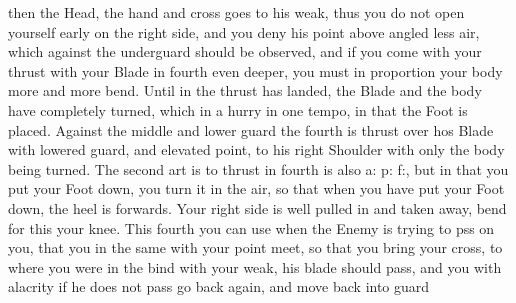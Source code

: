 then the Head, the hand and cross goes to his weak, thus you do not
open yourself early on the right side, and you deny his point above
angled less air,
which against the underguard should be observed, and if you come with
your thrust with your Blade in fourth even deeper, you must in
proportion your body more and more bend. Until in the thrust has
landed, the Blade and the body have completely turned, which in a
hurry in one tempo, in that the Foot is placed. Against the middle and
lower guard the fourth is thrust over hos Blade with lowered guard,
and elevated point, to his right Shoulder with only the body being turned.
The second art is to thrust in fourth is also a: p: f:, but in that
you put your Foot down, you turn it in the air, so that when you have
put your Foot down, the heel is forwards. Your right side is well
pulled in and taken away, bend for this your knee. This fourth you can
use when the Enemy is trying to pss on you, that you in the same with
your point meet, so that you bring your cross, to where you were in
the bind with your weak, his blade should pass, and you with alacrity
if he does not pass go back again, and move back into guard
